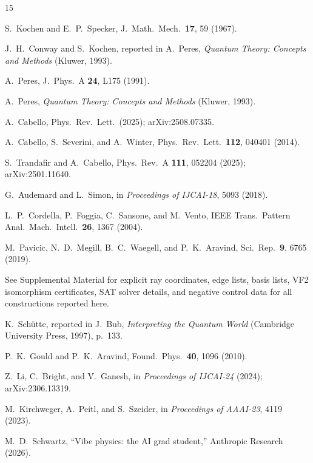 \documentclass[twocolumn,prl,superscriptaddress,nofootinbib]{revtex4-2}
\begin{document}
\begin{thebibliography}{15}

S.~Kochen and E.~P.~Specker,
J.\ Math.\ Mech.\ \textbf{17}, 59 (1967).

J.~H.~Conway and S.~Kochen,
reported in A.~Peres, \textit{Quantum Theory: Concepts and Methods} (Kluwer, 1993).

A.~Peres,
J.\ Phys.\ A \textbf{24}, L175 (1991).

A.~Peres,
\textit{Quantum Theory: Concepts and Methods} (Kluwer, 1993).

A.~Cabello,
Phys.\ Rev.\ Lett.\ (2025); arXiv:2508.07335.

A.~Cabello, S.~Severini, and A.~Winter,
Phys.\ Rev.\ Lett.\ \textbf{112}, 040401 (2014).

S.~Trandafir and A.~Cabello,
Phys.\ Rev.\ A \textbf{111}, 052204 (2025); arXiv:2501.11640.

G.~Audemard and L.~Simon,
in \textit{Proceedings of IJCAI-18}, 5093 (2018).

L.~P.~Cordella, P.~Foggia, C.~Sansone, and M.~Vento,
IEEE Trans.\ Pattern Anal.\ Mach.\ Intell.\ \textbf{26}, 1367 (2004).

M.~Pavicic, N.~D.~Megill, B.~C.~Waegell, and P.~K.~Aravind,
Sci.\ Rep.\ \textbf{9}, 6765 (2019).

See Supplemental Material for explicit ray coordinates, edge lists, basis lists, VF2 isomorphism certificates, SAT solver details, and negative control data for all constructions reported here.

K.~Sch\"utte,
reported in J.~Bub, \textit{Interpreting the Quantum World} (Cambridge University Press, 1997), p.~133.

P.~K.~Gould and P.~K.~Aravind,
Found.\ Phys.\ \textbf{40}, 1096 (2010).

Z.~Li, C.~Bright, and V.~Ganesh,
in \textit{Proceedings of IJCAI-24} (2024); arXiv:2306.13319.

M.~Kirchweger, A.~Peitl, and S.~Szeider,
in \textit{Proceedings of AAAI-23}, 4119 (2023).

M.~D.~Schwartz,
``Vibe physics: the AI grad student,''
Anthropic Research (2026).

\end{thebibliography}
\end{document}
